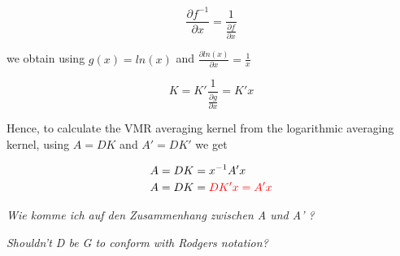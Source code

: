 \documentclass[a4paper]{article}
\begin{document}
\begin{equation}
  \frac{\partial f^{-1}}{\partial x} = \frac{1}{\frac{\partial f}{\partial x}}
\end{equation}

we obtain using $g(x) = ln(x)$ and $\frac{\partial ln(x)}{\partial x} = \frac{1}{x}$

\begin{equation}
  K = K' \frac{1}{\frac{\partial g}{\partial x}} = K' x
\end{equation}

Hence, to calculate the VMR averaging kernel from the logarithmic averaging kernel,  using $A = D K$ and $A' = D K'$ we get

\begin{align*}
A &= DK = x^{-1} A' x\\
A &= D K = \textcolor{red}{D K' x = A' x}
\end{align*}

\emph{Wie komme ich auf den Zusammenhang zwischen A und A' ?}

\emph{Shouldn't D be G to conform with Rodgers notation?}
\end{document}
